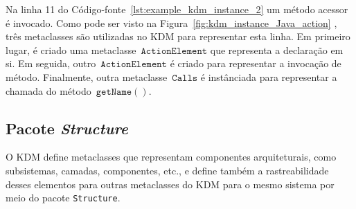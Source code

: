 
Na linha 11 do Código-fonte~\ref{lst:example_kdm_instance_2}  um método acessor é invocado. Como pode ser visto na Figura~\ref{fig:kdm_instance_Java_action} , três metaclasses são utilizadas no KDM para representar esta linha. Em primeiro lugar, é criado uma metaclasse~$\mathtt{ActionElement}$ que representa a declaração em si. Em seguida, outro~$\mathtt{ActionElement}$ é criado para representar a invocação de método. Finalmente, outra metaclasse~$\mathtt{Calls}$ é instânciada para representar a chamada do método~$\mathtt{getName()}$.

\subsection{Pacote \textit{Structure}}\label{sec:structurePackage}

O KDM define metaclasses que representam componentes arquiteturais, como subsistemas, camadas, componentes, etc., e define também a rastreabilidade desses elementos para outras metaclasses do KDM para o mesmo sistema por meio do pacote \texttt{Structure}.

